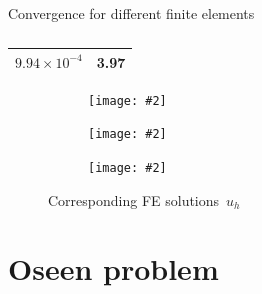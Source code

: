 \documentclass[svgnames]{beamer} %
\newcommand{\includegraphicsw}[2][1.]{\texttt{[image: \#2]}}
\begin{document}
\begin{frame}{Convergence for different finite elements}
\begin{table}
\begin{subtable}[b]{.3\linewidth}
\begin{tabular}[.7]{ | c | c | }
					$9.94 \times 10^{-4}$ & 3.97 \\
					\hline
				\end{tabular}
				\caption{}
				\label{tab:divgrad_conv:c}
			\end{subtable}%
		\end{table} 
		\begin{figure}
			\centering
			\begin{subfigure}{.35\linewidth}\centering
				\includegraphicsw[.8]{divgrad_l1_u.pdf}
			\end{subfigure}%
			\hfill
			\begin{subfigure}{.3\linewidth}\centering
				\includegraphicsw[.8]{divgrad_l2_u.pdf}
			\end{subfigure}%
			\hfill
			\begin{subfigure}{.3\linewidth}\centering
				\includegraphicsw[.8]{divgrad_cr_u.pdf}
			\end{subfigure}
			\caption{Corresponding FE solutions~$u_h$}
			\label{fig:divgrad_solns}
		\end{figure}
	\end{frame}
	
	\section{Oseen problem}
	
\end{document}
